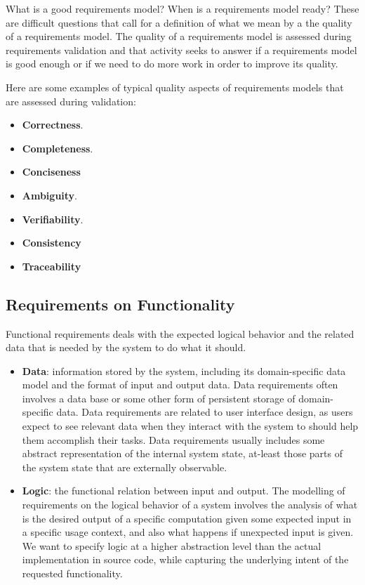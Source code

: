 What is a good requirements model? When is a requirements model ready? These are difficult questions that call for a definition of what we mean by a the quality of a requirements model. The quality of a requirements model is assessed during requirements validation and that activity seeks to answer if a requirements model is good enough or if we need to do more work in order to improve its quality.

Here are some examples of typical quality aspects of requirements models that are assessed during validation:
\begin{itemize}
  \item \textbf{Correctness}.
  \item \textbf{Completeness}.
  \item \textbf{Conciseness}
  \item \textbf{Ambiguity}.
  \item \textbf{Verifiability}.
  \item \textbf{Consistency}
  \item \textbf{Traceability}
\end{itemize}

\subsection*{Requirements on Functionality}
Functional requirements deals with the expected logical behavior and the related data that is needed by the system to do what it should.
\begin{itemize}
  \item \textbf{Data}: information stored by the system, including its domain-specific data model and the format of input and output data. Data requirements often involves a data base or some other form of persistent storage of domain-specific data. Data requirements are related to user interface design, as users expect to see relevant data when they interact with the system to should help them accomplish their tasks. Data requirements usually includes some abstract representation of the internal system state, at-least those parts of the system state that are externally observable.
  \item \textbf{Logic}: the functional relation between input and output. The modelling of requirements on the logical behavior of a system involves the analysis of what is the desired output of a specific computation given some expected input in a specific usage context, and also what happens if unexpected input is given. We want to specify logic at a higher abstraction level than the actual implementation in source code, while capturing the underlying intent of the requested functionality. 
\end{itemize}


